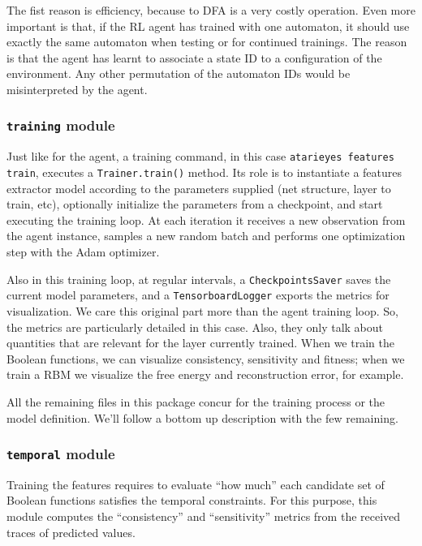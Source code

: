 The fist reason is efficiency, because \ldl{} to DFA is a very costly
operation. Even more important is that, if the RL agent has trained with one
automaton, it should use exactly the same automaton when testing or for
continued trainings. The reason is that the agent has learnt to associate a
state ID to a configuration of the environment. Any other permutation of the
automaton IDs would be misinterpreted by the agent.


\subsubsection*{\texttt{training} module}

Just like for the agent, a training command, in this case
\verb|atarieyes features train|, executes a \verb|Trainer.train()| method.
Its role is to instantiate a features extractor model according to the
parameters supplied (net structure, layer to train, etc), optionally
initialize the parameters from a checkpoint, and start executing the training
loop.  At each iteration it receives a new observation from the agent
instance, samples a new random batch and performs one optimization step with
the Adam optimizer.

Also in this training loop, at regular intervals, a \texttt{CheckpointsSaver}
saves the current model parameters, and a \texttt{TensorboardLogger} exports
the metrics for visualization. We care this original part more than the agent
training loop. So, the metrics are particularly detailed in this case. Also,
they only talk about quantities that are relevant for the layer currently
trained. When we train the Boolean functions, we can visualize consistency,
sensitivity and fitness; when we train a RBM we visualize the free energy and
reconstruction error, for example.

All the remaining files in this package concur for the training process or the
model definition. We'll follow a bottom up description with the few remaining.


\subsubsection*{\texttt{temporal} module}

Training the features requires to evaluate ``how much'' each candidate set of
Boolean functions satisfies the temporal constraints. For this purpose, this
module computes the ``consistency'' and ``sensitivity'' metrics from the
received traces of predicted values.


